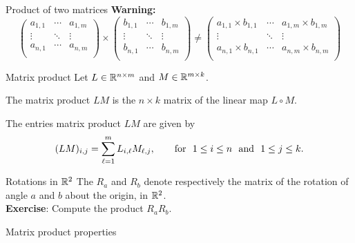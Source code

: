 \documentclass{beamer}
\begin{document}
\begin{frame}[t]{Product of two matrices}
	\textbf{Warning:}
	{\small
		$$
		\!\!\!\!\!\!\!\!\!\!\!\!
		\begin{pmatrix}
			a_{1,1}  & \cdots & a_{1,m} \\
			\vdots & \ddots & \vdots \\
			a_{n,1} & \cdots & a_{n,m} \\
		\end{pmatrix}
		\times
		\begin{pmatrix}
			b_{1,1}  & \cdots & b_{1,m} \\
			\vdots & \ddots & \vdots \\
			b_{n,1} & \cdots & b_{n,m} \\
		\end{pmatrix}
		\neq
		\begin{pmatrix}
			a_{1,1} \times b_{1,1}  & \cdots & a_{1,m} \times b_{1,m} \\
			\vdots & \ddots & \vdots \\
			a_{n,1} \times b_{n,1} & \cdots & a_{n,m} \times b_{n,m} \\
		\end{pmatrix}
		$$
	}
\end{frame}

\begin{frame}[t]{Matrix product}
	Let $L \in \mathbb{R}^{n \times m}$ and $M \in \mathbb{R}^{m \times k}$. 
	\begin{definition}
		The matrix product $LM$ is the $n \times k$ matrix of the linear map $L \circ M$.
	\end{definition}
	\vspace{2.7cm}
	\begin{theorem}
		The entries matrix product $LM$ are given by
		\vspace{-0.2cm}
		$$
		(LM)_{i,j} 
		=\sum_{\ell = 1}^m L_{i,\ell} M_{\ell,j}, \qquad \text{for} \ \  1 \leq i \leq n \ \ \text{and} \ \ 1 \leq j \leq k.
		\vspace{-0.2cm}
		$$
	\end{theorem}
\end{frame}
\begin{frame}[t]{Rotations in $\mathbb{R}^2$}
	The $R_{a}$ and $R_{b}$ denote respectively the matrix of the rotation of angle $a$ and $b$ about the origin, in $\mathbb{R}^2$.
	\\
	\vspace{0.3cm}
	\textbf{Exercise}:
	Compute the product $R_a R_b$.

\end{frame}
\begin{frame}[t]{Matrix product properties}
\end{frame}
\end{document}
